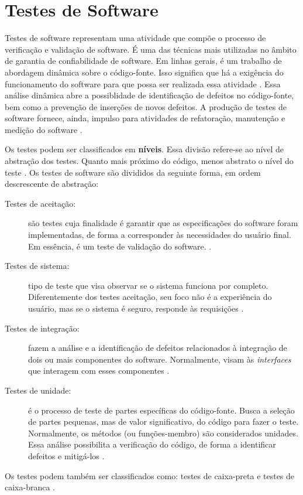 \section{Testes de Software}
Testes de software representam uma atividade que compõe o processo de verificação e validação de software. É uma das técnicas mais utilizadas no âmbito de garantia de confiabilidade de software. Em linhas gerais, é um trabalho de abordagem dinâmica sobre o código-fonte. Isso significa que há a exigência do funcionamento do software para que possa ser realizada essa atividade \cite{barbosaEtAl2009}. Essa análise dinâmica abre a possiblidade de identificação de defeitos no código-fonte, bem como a prevenção de inserções de novos defeitos. A produção de testes de software fornece, ainda, impulso para atividades de refatoração, manutenção e medição do software \cite{barbosaEtAl2009}.
\par
\indent Os testes podem ser classificados em \textbf{níveis}. Essa divisão refere-se ao nível de abstração dos testes. Quanto mais próximo do código, menos abstrato o nível do teste \cite{sommerville2007}. Os testes de software são divididos da seguinte forma, em ordem descrescente de abstração:
\begin{description}
\item[Testes de aceitação:] são testes cuja finalidade é garantir que as especificações do software foram implementadas, de forma a corresponder às necessidades do usuário final. Em essência, é um teste de validação do software. \cite{sommerville2007}.
\item[Testes de sistema:] tipo de teste que visa observar se o sistema funciona por completo. Diferentemente dos testes aceitação, seu foco não é a experiência do usuário, mas se o sistema é seguro, responde às requisições \cite{sommerville2007}.
\item[Testes de integração:] fazem a análise e a identificação de defeitos relacionados à integração de dois ou mais componentes do software. Normalmente, visam às \textit{interfaces} que interagem com esses componentes \cite{sommerville2007}.
\item[Testes de unidade:] é o processo de teste de partes específicas do código-fonte. Busca a seleção de partes pequenas, mas de valor significativo, do código para fazer o teste. Normalmente, os métodos (ou funções-membro) são considerados unidades. Essa análise possibilita a verificação do código, de forma a identificar defeitos e mitigá-los \cite{sommerville2007}.
\end{description}
\par
\indent Os testes podem também ser classificados como: testes de caixa-preta e testes de caixa-branca \cite{barbosaEtAl2009}.


